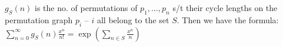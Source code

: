 $g_S(n)$ is the no. of permutations of $p_1,\dotsc,p_n$ s/t their cycle lengths on the permutation graph $p_i$ -- $i$ all belong to the set $S$. Then we have the formula:
$\displaystyle \sum_{n=0} ^\infty g_S(n) \frac{x^n}{n!} = \exp\left(\sum_{n\in S} \frac{x^n} {n} \right)$